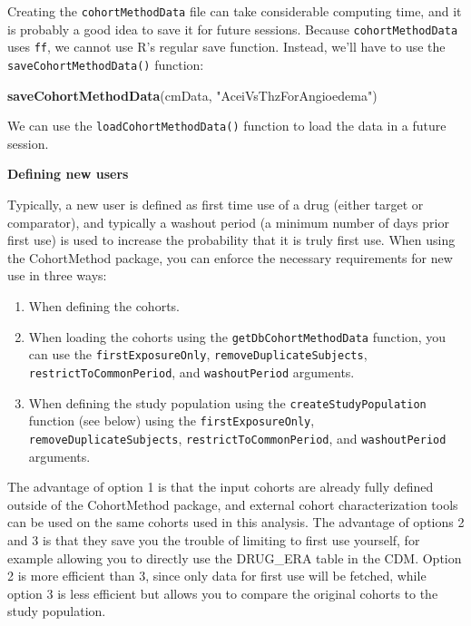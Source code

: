 \documentclass[11pt]{book}
\newenvironment{Shaded}{\begin{snugshade}}{\end{snugshade}}
\newcommand{\KeywordTok}[1]{\textcolor[rgb]{0.13,0.29,0.53}{\textbf{#1}}}
\newcommand{\StringTok}[1]{\textcolor[rgb]{0.31,0.60,0.02}{#1}}
\newcommand{\NormalTok}[1]{#1}
\providecommand{\tightlist}{%
  \setlength{\itemsep}{0pt}\setlength{\parskip}{0pt}}
\begin{document}
Creating the \texttt{cohortMethodData} file can take considerable
computing time, and it is probably a good idea to save it for future
sessions. Because \texttt{cohortMethodData} uses \texttt{ff}, we cannot
use R's regular save function. Instead, we'll have to use the
\texttt{saveCohortMethodData()} function:

\begin{Shaded}
\begin{Highlighting}[]
\KeywordTok{saveCohortMethodData}\NormalTok{(cmData, }\StringTok{"AceiVsThzForAngioedema"}\NormalTok{)}
\end{Highlighting}
\end{Shaded}

We can use the \texttt{loadCohortMethodData()} function to load the data
in a future session.

\textbf{Defining new users}

Typically, a new user is defined as first time use of a drug (either
target or comparator), and typically a washout period (a minimum number
of days prior first use) is used to increase the probability that it is
truly first use. When using the CohortMethod package, you can enforce
the necessary requirements for new use in three ways:

\begin{enumerate}
\def\labelenumi{\arabic{enumi}.}
\tightlist
\item
  When defining the cohorts.
\item
  When loading the cohorts using the \texttt{getDbCohortMethodData}
  function, you can use the \texttt{firstExposureOnly},
  \texttt{removeDuplicateSubjects}, \texttt{restrictToCommonPeriod}, and
  \texttt{washoutPeriod} arguments.
\item
  When defining the study population using the
  \texttt{createStudyPopulation} function (see below) using the
  \texttt{firstExposureOnly}, \texttt{removeDuplicateSubjects},
  \texttt{restrictToCommonPeriod}, and \texttt{washoutPeriod} arguments.
\end{enumerate}

The advantage of option 1 is that the input cohorts are already fully
defined outside of the CohortMethod package, and external cohort
characterization tools can be used on the same cohorts used in this
analysis. The advantage of options 2 and 3 is that they save you the
trouble of limiting to first use yourself, for example allowing you to
directly use the DRUG\_ERA table in the CDM. Option 2 is more efficient
than 3, since only data for first use will be fetched, while option 3 is
less efficient but allows you to compare the original cohorts to the
study population.
\end{document}
